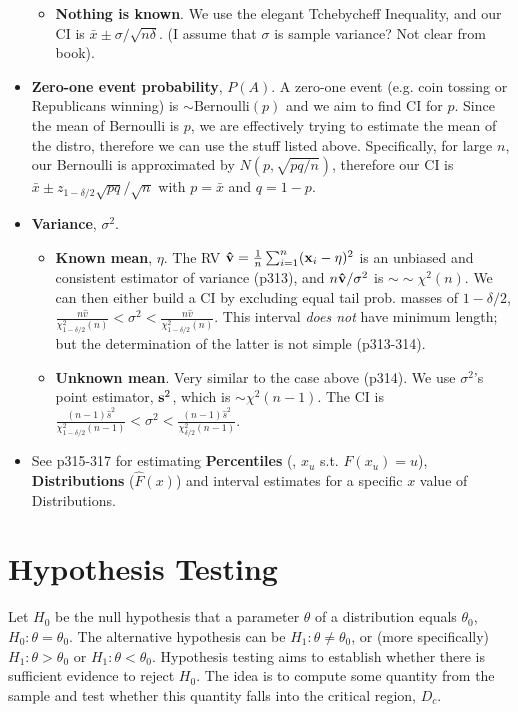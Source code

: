 \documentclass[a4paper, oneside]{book}
\begin{document}
\begin{itemize}
\begin{itemize}
	\item \textbf{Nothing is known}. We use the elegant Tchebycheff Inequality, and our CI is $\bar{x}\pm \sigma/\sqrt{n\delta}$. (I assume that $\sigma$ is sample variance? Not clear from book).
	\end{itemize}
\item \textbf{Zero-one event probability}, $P(A)$. A zero-one event (e.g. coin tossing or Republicans winning) is $\sim\text{Bernoulli}(p)$ and we aim to find CI for $p$. Since the mean of Bernoulli is $p$, we are effectively trying to estimate the mean of the distro, therefore we can use the stuff listed above. Specifically, for large $n$, our Bernoulli is approximated by $N(p, \sqrt{pq/n})$, therefore our CI is $\bar{x}\pm z_{1-\delta/2} \sqrt{pq}/\sqrt{n}$ with $p=\bar{x}$ and $q=1-p$.
\item \textbf{Variance}, $\sigma^2$.
	\begin{itemize}
	\item \textbf{Known mean}, $\eta$. The RV $\mathbf{\hat{v}}=\frac{1}{n}\sum_{i=1}^n(\mathbf{x}_i-\eta)^2$ is an unbiased and consistent estimator of variance (p313), and $n\mathbf{\hat{v}}/\sigma^2$ is $\sim\sim\chi^2(n)$. We can then either build a CI by excluding equal tail prob. masses of $1-\delta/2$, \ie $\frac{n\hat{v}}{\chi^2_{1-\delta/2}(n)}<\sigma^2<\frac{n\hat{v}}{\chi^2_{1-\delta/2}(n)}$. This interval \textit{does not} have minimum length; but the determination of the latter is not simple (p313-314).
	\item \textbf{Unknown mean}. Very similar to the case above (p314). We use $\sigma^2$'s point estimator, $\mathbf{s}^2$, which is $\sim\chi^2(n-1)$. The CI is $\frac{(n-1)\hat{s}^2}{\chi^2_{1-\delta/2}(n-1)}<\sigma^2<\frac{(n-1)\hat{s}^2}{\chi^2_{\delta/2}(n-1)}$.
	\end{itemize}
	\item See p315-317 for estimating \textbf{Percentiles} (\ie, $x_u$ s.t. $F(x_u)=u$), \textbf{Distributions} ($\hat{F}(x)$) and interval estimates for a specific $x$ value of Distributions. 
\end{itemize}




\section{Hypothesis Testing}
Let $H_0$ be the null hypothesis that a parameter $\theta$ of a distribution equals $\theta_0$, \ie $H_0 : \theta = \theta_0$. The alternative hypothesis can be $H_1:\theta \neq \theta_0$, or (more specifically) $H_1:\theta > \theta_0$ or $H_1:\theta < \theta_0$. Hypothesis testing aims to establish whether there is sufficient evidence to reject $H_0$. The idea is to compute some quantity from the sample and test whether this quantity falls into the critical region, $D_c$. 
\end{document}
